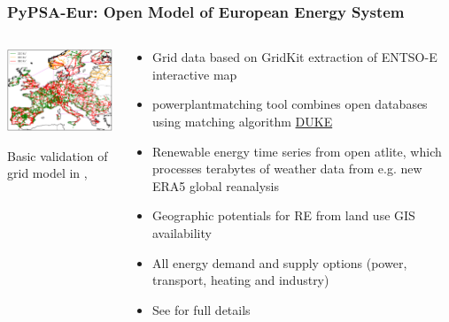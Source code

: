 \begin{frame}
  \frametitle{PyPSA-Eur: Open Model of European Energy System}
\begin{columns}[T]
\begin{column}{6cm}

  \vspace{0.3cm}
\centering

\includegraphics[width=7cm]{images/pypsa-eur-grid.png}

\vspace{.1cm}

Basic \alert{validation} of grid model in ,

\end{column}
\begin{column}{7.5cm}

  \begin{itemize}
    \item Grid data based on \alert{GridKit} extraction of ENTSO-E interactive map
    \item \alert{powerplantmatching} tool combines open databases using matching algorithm \href{https://github.com/larsga/Duke}{DUKE}
    \item Renewable energy time series from open \alert{atlite}, which processes terabytes of weather data from e.g. new ERA5 global reanalysis
    \item Geographic \alert{potentials} for RE from land use GIS availability
    \item All energy demand and supply options (power, transport, heating and industry)
      \item  See  for full details

  \end{itemize}
\end{column}
\end{columns}

\end{frame}



